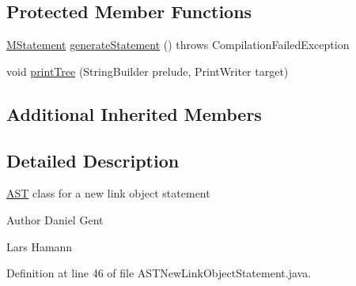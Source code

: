 \subsection*{Protected Member Functions}
\begin{DoxyCompactItemize}
\item 
\hyperlink{classorg_1_1tzi_1_1use_1_1uml_1_1sys_1_1soil_1_1_m_statement}{M\-Statement} \hyperlink{classorg_1_1tzi_1_1use_1_1parser_1_1soil_1_1ast_1_1_a_s_t_new_link_object_statement_a718f5591079d5b6ea29abfd16da5a26d}{generate\-Statement} ()  throws Compilation\-Failed\-Exception 
\item 
void \hyperlink{classorg_1_1tzi_1_1use_1_1parser_1_1soil_1_1ast_1_1_a_s_t_new_link_object_statement_a4ccf9356f5131f1940e5ff8f11f725bc}{print\-Tree} (String\-Builder prelude, Print\-Writer target)
\end{DoxyCompactItemize}
\subsection*{Additional Inherited Members}


\subsection{Detailed Description}
\hyperlink{classorg_1_1tzi_1_1use_1_1parser_1_1_a_s_t}{A\-S\-T} class for a new link object statement \begin{DoxyAuthor}{Author}
Daniel Gent 

Lars Hamann 
\end{DoxyAuthor}


Definition at line 46 of file A\-S\-T\-New\-Link\-Object\-Statement.\-java.



